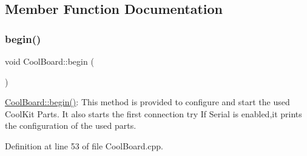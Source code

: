 \subsection{Member Function Documentation}
\mbox{\label{class_cool_board_acba7c5aef7268b2c0044bdb54d3b9d76}} 
\subsubsection{\texorpdfstring{begin()}{begin()}}
{\footnotesize\ttfamily void Cool\+Board\+::begin (\begin{DoxyParamCaption}{ }\end{DoxyParamCaption})}

\hyperlink{class_cool_board_acba7c5aef7268b2c0044bdb54d3b9d76}{Cool\+Board\+::begin()}\+: This method is provided to configure and start the used Cool\+Kit Parts. It also starts the first connection try If Serial is enabled,it prints the configuration of the used parts. 

Definition at line 53 of file Cool\+Board.\+cpp.



